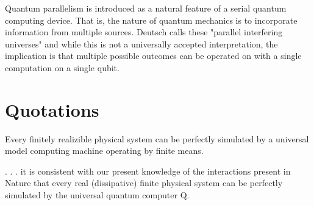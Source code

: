 \documentclass{article}
\begin{document}
Quantum parallelism is introduced as a natural feature of a serial quantum computing device. That is, the nature of quantum mechanics is to incorporate information from multiple sources. Deutsch calls these "parallel interfering universes" and while this is not a universally accepted interpretation, the implication is that multiple possible outcomes can be operated on with a single computation on a single qubit. 

\section{Quotations}
Every finitely realizible physical system can be perfectly simulated by a universal model computing machine operating by finite means.

. . . it is consistent with our present knowledge of the interactions present in Nature that every real (dissipative) finite physical system can be perfectly simulated by the universal quantum computer Q.
\end{document}
